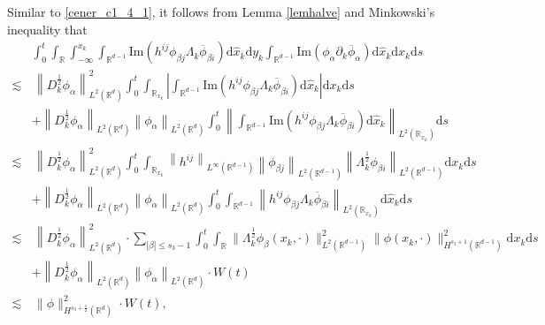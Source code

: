 \documentclass[10pt,twoside,a4paper]{article}
\numberwithin{equation}{section}\allowdisplaybreaks
\def\leq{\leqslant}
\begin{document}
Similar to \eqref{cener_c1_4_1},  it follows from Lemma \ref{lemhalve}  and  Minkowski's inequality that
\begin{align}  \label{cener_c1_4_4}
	&\int_0^t \int_{\mathbb{R}}   \int_{-\infty}^{x_k} \int_{\mathbb{R}^{d-1}}   \mathrm{Im} \left(  h^{ij} \phi_{\beta j}\Lambda_k\overline{\phi}_{\beta i}\right)\mathrm{d} \hat{x}_k \mathrm{d} y_k\int_{\mathbb{R}^{d-1}}  \mathrm{Im}\left( \phi_{\alpha } \partial_k \overline{\phi}_\alpha \right) \mathrm{d} \hat{x}_k  \mathrm{d} x_k \mathrm{d} s\nonumber\\
	\lesssim &\,\left\|   D_k^{\frac 12}\phi_\alpha\right\|_{L^2(\mathbb{R}^d)}^2 \int_0^t \int_{\mathbb{R}_{x_k}}\left|    \int_{\mathbb{R}^{d-1}}   \mathrm{Im} \left(  h^{ij} \phi_{\beta j}\Lambda_k\overline{\phi}_{\beta i}\right)\mathrm{d} \hat{x}_k \right|\mathrm{d} x_k\mathrm{d} s\nonumber\\
	&+\left\|   D_k^{\frac 12}\phi_{\alpha}\right\|_{L^2(\mathbb{R}^d)} \left\|   \phi_{\alpha}\right\|_{L^2(\mathbb{R}^d)} \int_0^t\left\| \int_{\mathbb{R}^{d-1}}   \mathrm{Im} \left(  h^{ij} \phi_{\beta j}\Lambda_k\overline{\phi}_{\beta i}\right)\mathrm{d} \hat{x}_k  \right\|_{L^2(\mathbb{R}_{x_k})}\mathrm{d} s\nonumber\\
	\lesssim &\,\left\|   D_k^{\frac 12}\phi_\alpha\right\|_{L^2(\mathbb{R}^d)}^2 \int_0^t \int_{\mathbb{R}_{x_k}} \left\| h^{ij}\right\|_{L^\infty (\mathbb{R}^{d-1})} \left\| \phi_{\beta j}\right\|_{L^2(\mathbb{R}^{d-1})} \left\| \Lambda_k^{\frac 12} \phi_{\beta i} \right\|_{L^2 (\mathbb{R}^{d-1})} \mathrm{d} x_k\mathrm{d} s\\
	&+\left\|   D_k^{\frac 12}\phi_{\alpha}\right\|_{L^2(\mathbb{R}^d)} \left\|   \phi_{\alpha}\right\|_{L^2(\mathbb{R}^d)} \int_0^t \int_{\mathbb{R}^{d-1}}    \left\|  h^{ij} \phi_{\beta j}\Lambda_k\overline{\phi}_{\beta i} \right\|_{L^2(\mathbb{R}_{x_k})}\mathrm{d} \hat{x}_k \mathrm{d} s\nonumber\\
	\lesssim &\,\left\|   D_k^{\frac 12}\phi_\alpha\right\|_{L^2(\mathbb{R}^d)}^2 \cdot \sum_{|\beta|\leq s_3-1}  \int_0^t	\int_{\mathbb{R}}   \| \Lambda_k^{\frac 12}\phi_{\beta}(x_k,\cdot)\|_{L^2(\mathbb{R}^{d-1})}^2  \|\phi (x_k,\cdot)\|^2_{H^{s_3+1}(\mathbb{R}^{d-1})}\mathrm{d} x_k \mathrm{d} s\nonumber\\
	&+\left\|   D_k^{\frac 12}\phi_{\alpha}\right\|_{L^2(\mathbb{R}^d)} \left\|   \phi_{\alpha}\right\|_{L^2(\mathbb{R}^d)} \cdot W(t)\nonumber\\
	\lesssim &\,\|\phi\|_{H^{s_3+\frac 12}(\mathbb{R}^d)}^2\cdot W (t),\nonumber
\end{align}
\end{document}
